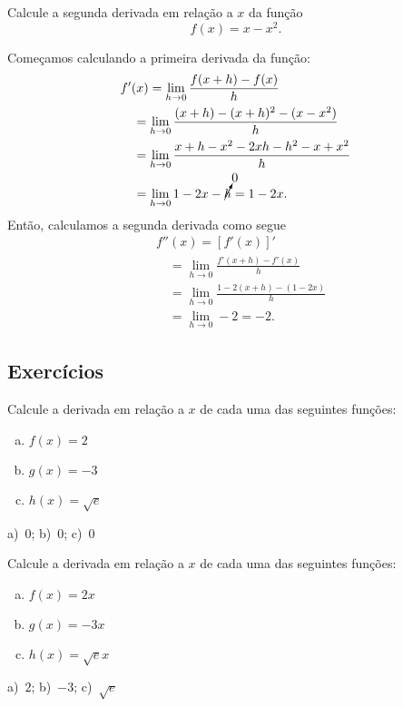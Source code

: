 \begin{exeresol}
  Calcule a segunda derivada em relação a $x$ da função
  \begin{equation}
    f(x) = x - x^2.
  \end{equation}
\end{exeresol}
\begin{resol}
  Começamos calculando a primeira derivada da função:
  \begin{align}
    & f'(x) = \lim_{h\to 0} \frac{f(x+h)-f(x)}{h} \\
    & \text{}\quad = \lim_{h\to 0} \frac{(x+h)-(x+h)^2-(x-x^2)}{h} \\
    & \text{}\quad = \lim_{h\to 0} \frac{x+h-x^2-2xh-h^2-x+x^2}{h} \\
    & \text{}\quad = \lim_{h\to 0} 1-2x-\cancelto{0}{h} = 1 - 2x.
  \end{align}
  Então, calculamos a segunda derivada como segue
  \begin{align}
    & f''(x) = [f'(x)]' \\
    & \text{}\quad = \lim_{h\to 0} \frac{f'(x+h)-f'(x)}{h} \\
    & \text{}\quad = \lim_{h\to 0} \frac{1-2(x+h)-(1-2x)}{h} \\
    & \text{}\quad = \lim_{h\to 0} -2 = -2.
  \end{align}
\end{resol}

\subsection{Exercícios}

\begin{exer}
  Calcule a derivada em relação a $x$ de cada uma das seguintes funções:
  \begin{enumerate}[a)]
  \item $f(x) = 2$
  \item $g(x) = -3$
  \item $h(x) = \sqrt{e}$
  \end{enumerate}
\end{exer}
\begin{resp}
  a)~$0$; b)~$0$; c)~$0$
\end{resp}

\begin{exer}
  Calcule a derivada em relação a $x$ de cada uma das seguintes funções:
  \begin{enumerate}[a)]
  \item $f(x) = 2x$
  \item $g(x) = -3x$
  \item $h(x) = \sqrt{e}x$
  \end{enumerate}
\end{exer}
\begin{resp}
  a)~$2$; b)~$-3$; c)~$\sqrt{e}$
\end{resp}

